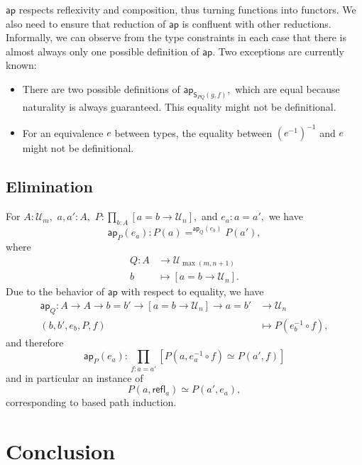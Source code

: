 \documentclass[a4paper]{article}
\theoremstyle{definition}
\theoremstyle{remark}
\renewcommand{\equiv}{\simeq}
\newcommand{\pathOver}[1]{=^{#1}}
\newcommand{\univVar}{\mathcal}
\newcommand{\U}{\univVar{U}}
\newcommand{\0}{\primType{0}}
\newcommand{\1}{\primType{1}}
\newcommand{\2}{\primType{2}}
\newcommand{\nm}{\mathsf}
\newcommand{\refl}{\nm{refl}}
\newcommand{\ap}{\nm{ap}}
\newcommand{\combinator}{\nm}
\newcommand{\revSubstFun}{\combinator{S}}
\begin{document}
$\ap$ respects reflexivity and composition, thus turning functions into functors. We also need to
ensure that reduction of $\ap$ is confluent with other reductions. Informally, we can observe from
the type constraints in each case that there is almost always only one possible definition of
$\ap.$ Two exceptions are currently known:
\begin{itemize}
  \item There are two possible definitions of $\ap_{\revSubstFun_{PQ}(g,f)},$ which are equal
  because naturality is always guaranteed. This equality might not be definitional.
  \item For an equivalence $e$ between types, the equality between $(e^{-1})^{-1}$ and $e$ might
  not be definitional.
\end{itemize}

\subsection{Elimination}

For $A : \U_m,$ $a,a' : A,$ $P : \prod_{b : A} [a = b \to \U_n],$ and $e_a : a = a',$ we
have
\[\ap_P(e_a) : P(a) \pathOver{\ap_Q(e_b)} P(a'),\]
where
\begin{align*}
  Q : A &\to     \U_{\max(m,n+1)}\\
      b &\mapsto [a = b \to \U_n].
\end{align*}
Due to the behavior of $\ap$ with respect to equality, we have
\begin{align*}
  \ap_Q : A \to A \to b = b' \to [a = b \to \U_n] \to a = b' &\to     \U_n\\
          (b,b',e_b,P,f)                                     &\mapsto P(e_b^{-1} \circ f),
\end{align*}
and therefore
\[\ap_P(e_a) : \prod_{f : a = a'} [P(a,e_a^{-1} \circ f) \equiv P(a',f)]\]
and in particular an instance of
\[P(a,\refl_a) \equiv P(a',e_a),\]
corresponding to based path induction.

\section{Conclusion}
\end{document}
